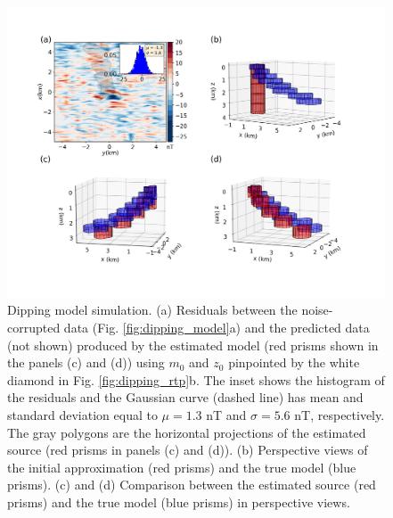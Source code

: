 \begin{figure}
    \centering
    \includegraphics[width=\linewidth]{figures/inclined-l2-solution.png}
    \caption{Dipping model simulation. (a) Residuals between the  noise-corrupted data (Fig. \ref{fig:dipping_model}a) and the predicted data (not shown) produced by the estimated model (red prisms shown in the panels (c) and (d)) using $m_0$  and $z_0$ pinpointed by the white diamond in Fig. \ref{fig:dipping_rtp}b. The inset shows the histogram of the residuals and the Gaussian curve (dashed line) has mean and standard deviation equal 
    to $\mu = 1.3$ nT and $\sigma=5.6$ nT, respectively. 
    The gray polygons are the horizontal projections of the estimated source (red prisms in panels (c) and (d)).
     (b) Perspective views of the initial approximation (red prisms) and the true model (blue prisms). 
     (c) and (d) Comparison between the estimated source (red prisms) and the true model (blue prisms) in perspective views.     
}
    \label{fig:dipping_results}
\end{figure}



